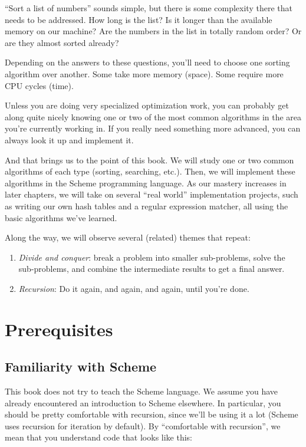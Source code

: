 \documentclass[12pt,openright,draft]{book}
\begin{document}
``Sort a list of numbers'' sounds simple, but there is some complexity
there that needs to be addressed.  How long is the list?  Is it longer
than the available memory on our machine?  Are the numbers in the list
in totally random order?  Or are they almost sorted already?

Depending on the answers to these questions, you'll need to choose one
sorting algorithm over another.  Some take more memory (space).  Some
require more CPU cycles (time).

Unless you are doing very specialized optimization work, you can
probably get along quite nicely knowing one or two of the most common
algorithms in the area you're currently working in.  If you really
need something more advanced, you can always look it up and implement
it.

And that brings us to the point of this book.  We will study one or
two common algorithms of each type (sorting, searching, etc.).  Then,
we will implement these algorithms in the Scheme programming language.
As our mastery increases in later chapters, we will take on several
``real world'' implementation projects, such as writing our own hash
tables and a regular expression matcher, all using the basic
algorithms we've learned.

Along the way, we will observe several (related) themes that repeat:

\begin{enumerate}
\item \emph{Divide and conquer}: break a problem into smaller
  sub-problems, solve the sub-problems, and combine the intermediate
  results to get a final answer.
\item \emph{Recursion}: Do it again, and again, and again, until
  you're done.
\end{enumerate}

\chapter{Prerequisites}

\section{Familiarity with Scheme}

This book does not try to teach the Scheme language.  We assume you
have already encountered an introduction to Scheme elsewhere. In
particular, you should be pretty comfortable with recursion, since
we'll be using it a lot (Scheme uses recursion for iteration by
default).  By ``comfortable with recursion'', we mean that you
understand code that looks like this:
\end{document}
